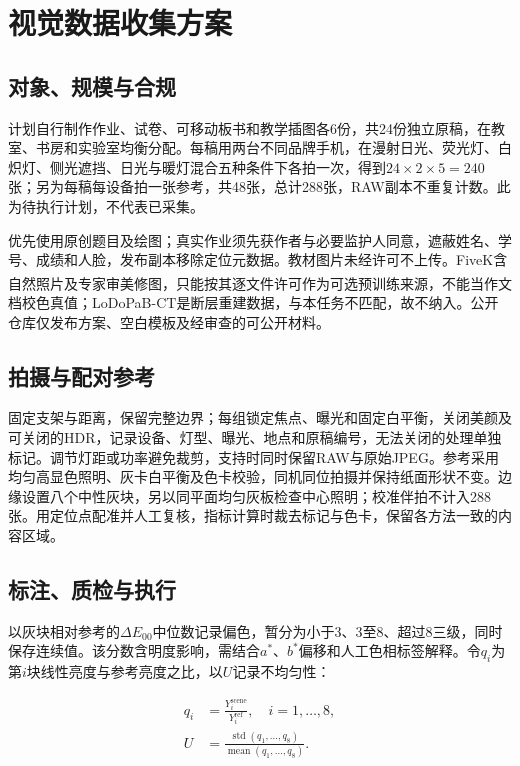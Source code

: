 \documentclass[UTF8,a4paper,zihao=5,fontset=none]{ctexart}
\begin{document}
\section{视觉数据收集方案}

\subsection{对象、规模与合规}

计划自行制作作业、试卷、可移动板书和教学插图各6份，共24份独立原稿，在教室、书房和实验室均衡分配。每稿用两台不同品牌手机，在漫射日光、荧光灯、白炽灯、侧光遮挡、日光与暖灯混合五种条件下各拍一次，得到$24\times2\times5=240$张；另为每稿每设备拍一张参考，共48张，总计288张，RAW副本不重复计数。此为待执行计划，不代表已采集。


优先使用原创题目及绘图；真实作业须先获作者与必要监护人同意，遮蔽姓名、学号、成绩和人脸，发布副本移除定位元数据。教材图片未经许可不上传。FiveK含自然照片及专家审美修图\textsuperscript{\cite{bychkovsky2011}}，只能按其逐文件许可作为可选预训练来源，不能当作文档校色真值；LoDoPaB-CT是断层重建数据，与本任务不匹配，故不纳入。公开仓库仅发布方案、空白模板及经审查的可公开材料。


\subsection{拍摄与配对参考}

固定支架与距离，保留完整边界；每组锁定焦点、曝光和固定白平衡，关闭美颜及可关闭的HDR，记录设备、灯型、曝光、地点和原稿编号，无法关闭的处理单独标记。调节灯距或功率避免裁剪，支持时同时保留RAW与原始JPEG。参考采用均匀高显色照明、灰卡白平衡及色卡校验，同机同位拍摄并保持纸面形状不变。边缘设置八个中性灰块，另以同平面均匀灰板检查中心照明；校准伴拍不计入288张。用定位点配准并人工复核，指标计算时裁去标记与色卡，保留各方法一致的内容区域。


\subsection{标注、质检与执行}

以灰块相对参考的$\Delta E_{00}$中位数记录偏色，暂分为小于3、3至8、超过8三级，同时保存连续值。该分数含明度影响，需结合$a^*$、$b^*$偏移和人工色相标签解释。令$q_i$为第$i$块线性亮度与参考亮度之比，以$U$记录不均匀性：


\begin{equation}
\begin{aligned}
q_i&=\frac{Y_i^{\mathrm{scene}}}{Y_i^{\mathrm{ref}}},\quad i=1,\ldots,8,\\
U&=\frac{\operatorname{std}(q_1,\ldots,q_8)}{\operatorname{mean}(q_1,\ldots,q_8)}.
\end{aligned}
\label{eq:3}
\end{equation}
\end{document}
